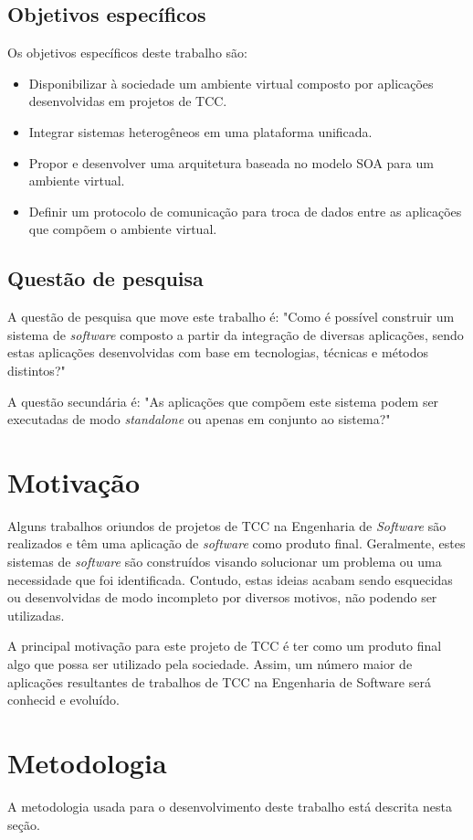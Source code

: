 \subsection{Objetivos específicos}
Os objetivos específicos deste trabalho são:
\begin{itemize}
\item Disponibilizar à sociedade um ambiente virtual composto por aplicações desenvolvidas em projetos de TCC.
\item Integrar sistemas heterogêneos em uma plataforma unificada.
\item Propor e desenvolver uma arquitetura baseada no modelo SOA para um ambiente virtual.
\item Definir um protocolo de comunicação para troca de dados entre as aplicações que compõem o ambiente virtual.
\end{itemize}

\subsection{Questão de pesquisa}
A questão de pesquisa que move este trabalho é: "Como é possível construir um sistema de \textit{software} composto a partir da integração de diversas aplicações, sendo estas aplicações desenvolvidas com base em tecnologias, técnicas e métodos distintos?"

A questão secundária é: "As aplicações que compõem este sistema podem ser executadas de modo \textit{standalone} ou apenas em conjunto ao sistema?"

\section{Motivação}
Alguns trabalhos oriundos de projetos de TCC na Engenharia de \textit{Software} são realizados e têm uma aplicação de \textit{software} como produto final. Geralmente, estes sistemas de \textit{software} são construídos visando solucionar um problema ou uma necessidade que foi identificada. Contudo, estas ideias acabam sendo esquecidas ou desenvolvidas de modo incompleto por diversos motivos, não podendo ser utilizadas.

A principal motivação para este projeto de TCC é ter como um produto final algo que possa ser utilizado pela sociedade. Assim, um número maior de aplicações resultantes de trabalhos de TCC na Engenharia de Software será conhecid e evoluído. 

\section{Metodologia}
A metodologia usada para o desenvolvimento deste trabalho está descrita nesta seção. 


